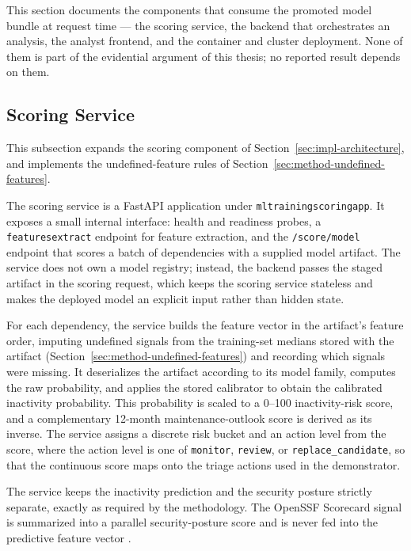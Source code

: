This section documents the components that consume the promoted model bundle at request time --- the scoring service, the backend that orchestrates an analysis, the analyst frontend, and the container and cluster deployment. None of them is part of the evidential argument of this thesis; no reported result depends on them.

\subsection{Scoring Service}
\label{sec:impl-scoring-service}

This subsection expands the scoring component of Section~\ref{sec:impl-architecture}, and implements the undefined-feature rules of Section~\ref{sec:method-undefined-features}.

The scoring service is a FastAPI application under \texttt{mltraining\sslash scoring\sslash app}. It exposes a small internal interface: health and readiness probes, a \texttt{\sslash features\sslash extract} endpoint for feature extraction, and the \texttt{/score/model} endpoint that scores a batch of dependencies with a supplied model artifact. The service does not own a model registry; instead, the backend passes the staged artifact in the scoring request, which keeps the scoring service stateless and makes the deployed model an explicit input rather than hidden state.

For each dependency, the service builds the feature vector in the artifact's feature order, imputing undefined signals from the training-set medians stored with the artifact (Section~\ref{sec:method-undefined-features}) and recording which signals were missing. It deserializes the artifact according to its model family, computes the raw probability, and applies the stored calibrator to obtain the calibrated inactivity probability. This probability is scaled to a 0--100 inactivity-risk score, and a complementary 12-month maintenance-outlook score is derived as its inverse. The service assigns a discrete risk bucket and an action level from the score, where the action level is one of \texttt{monitor}, \texttt{review}, or \texttt{replace\_candidate}, so that the continuous score maps onto the triage actions used in the demonstrator.

The service keeps the inactivity prediction and the security posture strictly separate, exactly as required by the methodology. The OpenSSF Scorecard signal is summarized into a parallel security-posture score and is never fed into the predictive feature vector \cite{zahan2023scorecard}.

